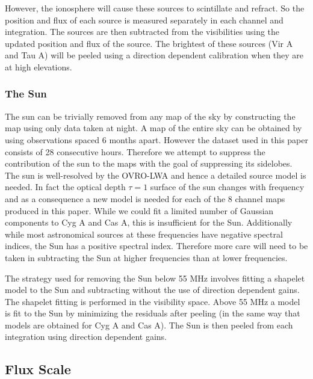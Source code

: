 \documentclass[twocolumn]{aastex61}
\begin{document}
However, the ionosphere will cause these sources to scintillate and refract. So the position and
flux of each source is measured separately in each channel and integration. The sources are then
subtracted from the visibilities using the updated position and flux of the source. The brightest of
these sources (Vir A and Tau A) will be peeled using a direction dependent calibration when they are
at high elevations.

\subsubsection{The Sun}

The sun can be trivially removed from any map of the sky by constructing the map using only data
taken at night. A map of the entire sky can be obtained by using observations spaced 6 months apart.
However the dataset used in this paper consists of 28 consecutive hours. Therefore we attempt to
suppress the contribution of the sun to the maps with the goal of suppressing its sidelobes.  The
sun is well-resolved by the OVRO-LWA and hence a detailed source model is needed. In fact the
optical depth $\tau=1$ surface of the sun changes with frequency and as a consequence a new model is
needed for each of the 8 channel maps produced in this paper. While we could fit a limited number of
Gaussian components to Cyg A and Cas A, this is insufficient for the Sun.  Additionally while most
astronomical sources at these frequencies have negative spectral indices, the Sun has a positive
spectral index. Therefore more care will need to be taken in subtracting the Sun at higher
frequencies than at lower frequencies.

The strategy used for removing the Sun below 55 MHz involves fitting a shapelet
\citep{2003MNRAS.338...35R} model to the Sun and subtracting without the use of direction dependent
gains. The shapelet fitting is performed in the visibility space. Above 55 MHz a model is fit to the
Sun by minimizing the residuals after peeling (in the same way that models are obtained for Cyg A
and Cas A). The Sun is then peeled from each integration using direction dependent gains.

\subsection{Flux Scale}
\end{document}

